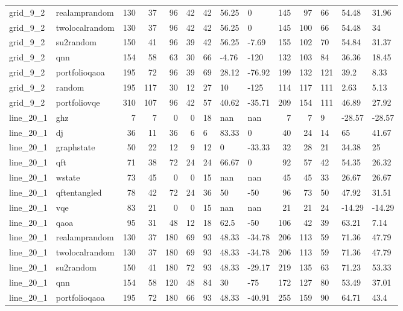 \begin{longtable}{llrrrrlllrrlll}
grid\_9\_2 & realamprandom & 130 & 37 & 96 & 42 & 42 & 56.25 & 0 & 145 & 97 & 66 & 54.48 & 31.96 \\
grid\_9\_2 & twolocalrandom & 130 & 37 & 96 & 42 & 42 & 56.25 & 0 & 145 & 100 & 66 & 54.48 & 34 \\
grid\_9\_2 & su2random & 150 & 41 & 96 & 39 & 42 & 56.25 & -7.69 & 155 & 102 & 70 & 54.84 & 31.37 \\
grid\_9\_2 & qnn & 154 & 58 & 63 & 30 & 66 & -4.76 & -120 & 132 & 103 & 84 & 36.36 & 18.45 \\
grid\_9\_2 & portfolioqaoa & 195 & 72 & 96 & 39 & 69 & 28.12 & -76.92 & 199 & 132 & 121 & 39.2 & 8.33 \\
grid\_9\_2 & random & 195 & 117 & 30 & 12 & 27 & 10 & -125 & 114 & 117 & 111 & 2.63 & 5.13 \\
grid\_9\_2 & portfoliovqe & 310 & 107 & 96 & 42 & 57 & 40.62 & -35.71 & 209 & 154 & 111 & 46.89 & 27.92 \\
line\_20\_1 & ghz & 7 & 7 & 0 & 0 & 18 & nan & nan & 7 & 7 & 9 & -28.57 & -28.57 \\
line\_20\_1 & dj & 36 & 11 & 36 & 6 & 6 & 83.33 & 0 & 40 & 24 & 14 & 65 & 41.67 \\
line\_20\_1 & graphstate & 50 & 22 & 12 & 9 & 12 & 0 & -33.33 & 32 & 28 & 21 & 34.38 & 25 \\
line\_20\_1 & qft & 71 & 38 & 72 & 24 & 24 & 66.67 & 0 & 92 & 57 & 42 & 54.35 & 26.32 \\
line\_20\_1 & wstate & 73 & 45 & 0 & 0 & 15 & nan & nan & 45 & 45 & 33 & 26.67 & 26.67 \\
line\_20\_1 & qftentangled & 78 & 42 & 72 & 24 & 36 & 50 & -50 & 96 & 73 & 50 & 47.92 & 31.51 \\
line\_20\_1 & vqe & 83 & 21 & 0 & 0 & 15 & nan & nan & 21 & 21 & 24 & -14.29 & -14.29 \\
line\_20\_1 & qaoa & 95 & 31 & 48 & 12 & 18 & 62.5 & -50 & 106 & 42 & 39 & 63.21 & 7.14 \\
line\_20\_1 & realamprandom & 130 & 37 & 180 & 69 & 93 & 48.33 & -34.78 & 206 & 113 & 59 & 71.36 & 47.79 \\
line\_20\_1 & twolocalrandom & 130 & 37 & 180 & 69 & 93 & 48.33 & -34.78 & 206 & 113 & 59 & 71.36 & 47.79 \\
line\_20\_1 & su2random & 150 & 41 & 180 & 72 & 93 & 48.33 & -29.17 & 219 & 135 & 63 & 71.23 & 53.33 \\
line\_20\_1 & qnn & 154 & 58 & 120 & 48 & 84 & 30 & -75 & 172 & 127 & 80 & 53.49 & 37.01 \\
line\_20\_1 & portfolioqaoa & 195 & 72 & 180 & 66 & 93 & 48.33 & -40.91 & 255 & 159 & 90 & 64.71 & 43.4 \\

\end{longtable}
